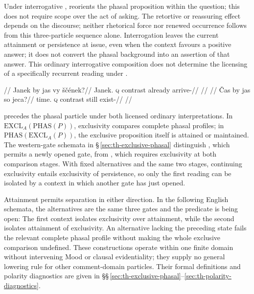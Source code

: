 Under interrogative ,  reorients the phasal
proposition within the question; this does not require scope over the act
of asking. The retortive or reassuring effect depends
on the discourse; neither rhetorical force nor renewed occurrence follows
from this three-particle sequence alone. Interrogation leaves the current
attainment or persistence at issue, even when the context favours a positive
answer; it does not convert the phasal background into an assertion of that
answer. This ordinary interrogative composition does not determine the
licensing of a specifically recurrent reading under .

\pex
\a
\begingl
\glpreamble {}//
\gla Janek by jas vy ščének?//
\glb Janek.\Dir{} \textsc{q} contrast already arrive-\Pf{}//
\glft {}//
\endgl
\a
\begingl
\glpreamble {}//
\gla Čas by jas so jeca?//
\glb time.\Dir{} \textsc{q} contrast still exist-\Cont{}//
\glft {}//
\endgl
\xe

 precedes the phasal particle under both licensed ordinary
interpretations. In $\mathrm{EXCL}_{A}(\mathrm{PHAS}(P))$, exclusivity
compares complete phasal profiles; in
$\mathrm{PHAS}(\mathrm{EXCL}_{A}(P))$, the exclusive proposition itself
is attained or maintained. The western-gate schemata in
§\,\ref{sec:th-exclusive-phasal} distinguish , which permits a newly opened gate, from , which requires exclusivity at both
comparison stages. With fixed alternatives and the same two stages,
continuing exclusivity entails exclusivity of persistence, so only the first
reading can be isolated by a context in which another gate has just opened.

Attainment permits separation in either direction. In the following English
schemata, the alternatives are the same three gates and the predicate is
being open:
\pex
\a {}
\a {}
\xe
The first context isolates exclusivity over attainment, while the second
isolates attainment of exclusivity. An alternative lacking the preceding
state fails the relevant complete phasal profile without making the whole
exclusive comparison undefined. These constructions operate within one finite
domain without intervening Mood or clausal evidentiality; they supply no
general lowering rule for other comment-domain particles. Their formal
definitions and polarity diagnostics are given in
§§\,\ref{sec:th-exclusive-phasal}--\ref{sec:th-polarity-diagnostics}.

